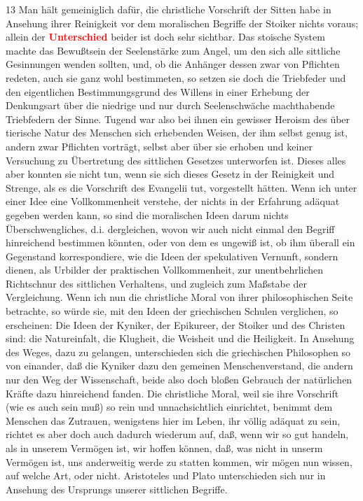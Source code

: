 \documentclass[a4paper,12pt,twoside]{book}
\newcommand{\match}[1]{\textcolor{red}{\textbf{#1}}}
\begin{document}
	13 Man hält gemeiniglich dafür, die christliche Vorschrift der Sitten habe in Ansehung ihrer Reinigkeit vor dem moralischen Begriffe der Stoiker nichts voraus; allein der \match{Unterschied} beider ist doch sehr sichtbar. Das stoische System machte das Bewußtsein der Seelenstärke zum Angel, um den sich alle sittliche Gesinnungen wenden sollten, und, ob die Anhänger dessen zwar von Pflichten redeten, auch sie ganz wohl bestimmeten, so setzen sie doch die Triebfeder und den eigentlichen Bestimmungsgrund des Willens in einer Erhebung der Denkungsart über die niedrige und nur durch Seelenschwäche machthabende Triebfedern der Sinne. Tugend war also bei ihnen ein gewisser Heroism des über tierische Natur des Menschen sich erhebenden Weisen, der ihm selbst genug ist, andern zwar Pflichten vorträgt, selbst aber über sie erhoben und keiner Versuchung zu Übertretung des sittlichen Gesetzes unterworfen ist. Dieses alles aber konnten sie nicht tun, wenn sie sich dieses Gesetz in der Reinigkeit und Strenge, als es die Vorschrift des Evangelii tut, vorgestellt hätten. Wenn ich unter einer Idee eine Vollkommenheit verstehe, der nichts in der Erfahrung adäquat gegeben werden kann, so sind die moralischen Ideen darum nichts Überschwengliches, d.i. dergleichen, wovon wir auch nicht einmal den Begriff hinreichend bestimmen könnten, oder von dem es ungewiß ist, ob ihm überall ein Gegenstand korrespondiere, wie die Ideen der spekulativen Vernunft, sondern dienen, als Urbilder der praktischen Vollkommenheit, zur unentbehrlichen Richtschnur des sittlichen Verhaltens, und zugleich zum Maßstabe der Vergleichung. Wenn ich nun die christliche Moral von ihrer philosophischen Seite betrachte, so würde sie, mit den Ideen der griechischen Schulen verglichen, so erscheinen: Die Ideen der Kyniker, der Epikureer, der Stoiker und des Christen sind: die Natureinfalt, die Klugheit, die Weisheit und die Heiligkeit. In Ansehung des Weges, dazu zu gelangen, unterschieden sich die griechischen Philosophen so von einander, daß die Kyniker dazu den gemeinen Menschenverstand, die andern nur den Weg der Wissenschaft, beide also doch bloßen Gebrauch der natürlichen Kräfte dazu hinreichend fanden. Die christliche Moral, weil sie ihre Vorschrift (wie es auch sein muß) so rein und unnachsichtlich einrichtet, benimmt dem Menschen das Zutrauen, wenigstens hier im Leben, ihr völlig adäquat zu sein, richtet es aber doch auch dadurch wiederum auf, daß, wenn wir so gut handeln, als in unserem Vermögen ist, wir hoffen können, daß, was nicht in unserm Vermögen ist, uns anderweitig werde zu statten kommen, wir mögen nun wissen, auf welche Art, oder nicht. Aristoteles und Plato unterschieden sich nur in Ansehung des Ursprungs unserer sittlichen Begriffe. 
	
\end{document}
